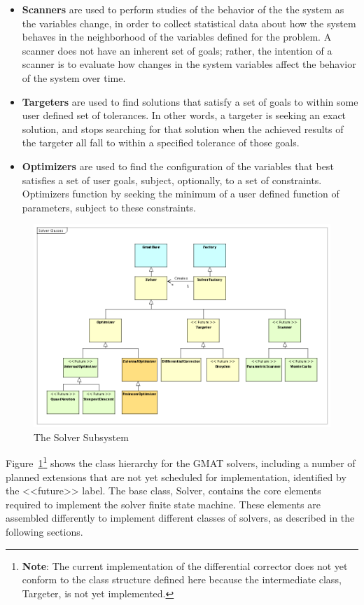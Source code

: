 \begin{itemize}
\item \textbf{Scanners} are used to perform studies of the behavior of the the system as the
variables change, in order to collect statistical data about how the system behaves in the
neighborhood of the variables defined for the problem.  A scanner does not have an inherent set of
goals; rather, the intention of a scanner is to evaluate how changes in the system variables affect
the behavior of the system over time.
\item \textbf{Targeters} are used to find solutions that satisfy a set of goals to within some user
defined set of tolerances.  In other words, a targeter is seeking an exact solution, and stops
searching for that solution when the achieved results of the targeter all fall to within a specified
tolerance of those goals.
\item \textbf{Optimizers} are used to find the configuration of the variables that best satisfies a
set of user goals, subject, optionally, to a set of constraints.  Optimizers function by seeking the
minimum of a user defined function of parameters, subject to these constraints.
\end{itemize}

\begin{figure}[tb]
\begin{center}
\includegraphics[460,307]{Images/SolverClasses.png}
\caption{\label{figure:SolverClasses}The Solver Subsystem}
\end{center}
\end{figure}

Figure~\ref{figure:SolverClasses}\footnote{\textbf{Note}: The current implementation of the
differential corrector does not yet conform to the class structure defined here because the
intermediate class, Targeter, is not yet implemented.} shows the class hierarchy for the GMAT
solvers, including a number of planned extensions that are not yet scheduled for implementation,
identified by the <<future>> label. The base class, Solver, contains the core elements required to
implement the solver finite state machine.  These elements are assembled differently to implement
different classes of solvers, as described in the following sections.

